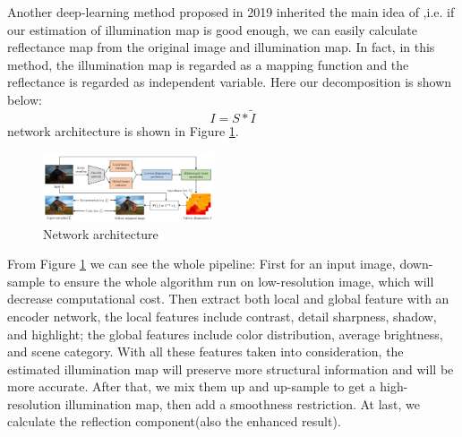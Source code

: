 \documentclass[10pt,twocolumn,letterpaper]{article}
\begin{document}
Another deep-learning method proposed in 2019\cite{wang2019underexposed} inherited the main idea of \cite{guo2016lime},i.e. if our estimation of illumination map is good enough, we can easily calculate reflectance map from the original image and illumination map. In fact, in this method, the illumination map is regarded as a mapping function and the reflectance is regarded as independent variable.  Here our decomposition is shown below:
\begin{equation}
    I = S \ast \tilde{I}
\end{equation}
network architecture is shown in Figure \ref{fig:Under-Net}.
\begin{figure}[t]
    \centering
    \includegraphics[width=0.45\textwidth]{latex/Under_net.png}
    \caption{Network architecture \cite{wang2019underexposed}}
    \label{fig:Under-Net}
\end{figure}
From Figure \ref{fig:Under-Net} we can see the whole pipeline: First for an input image, down-sample to ensure the whole algorithm run on low-resolution image, which will decrease computational cost. Then extract both local and global feature with an encoder network, the local features include contrast, detail sharpness, shadow, and highlight; the global features include color distribution, average brightness, and scene category. With all these features taken into consideration, the estimated illumination map will preserve more structural information and will be more accurate. After that, we mix them up and up-sample to get a high-resolution illumination map, then add a smoothness restriction. At last, we calculate the reflection component(also the enhanced result).
\end{document}
